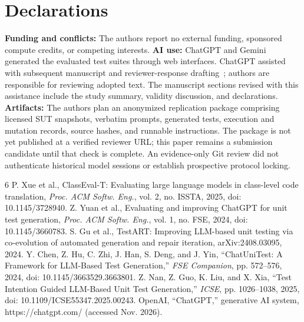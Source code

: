 \documentclass[conference]{IEEEtran}
\begin{document}
\section*{Declarations}
\textbf{Funding and conflicts:} The authors report no external funding, sponsored compute credits, or competing interests. \textbf{AI use:} ChatGPT and Gemini generated the evaluated test suites through web interfaces. ChatGPT assisted with subsequent manuscript and reviewer-response drafting~\cite{chatgpttool}; authors are responsible for reviewing adopted text. The manuscript sections revised with this assistance include the study summary, validity discussion, and declarations. \textbf{Artifacts:} The authors plan an anonymized replication package comprising licensed SUT snapshots, verbatim prompts, generated tests, execution and mutation records, source hashes, and runnable instructions. The package is not yet published at a verified reviewer URL; this paper remains a submission candidate until that check is complete. An evidence-only Git review did not authenticate historical model sessions or establish prospective protocol locking.

\begin{thebibliography}{6}
 P. Xue et al., ClassEval-T: Evaluating large language models in class-level code translation, \emph{Proc. ACM Softw. Eng.}, vol. 2, no. ISSTA, 2025, doi: 10.1145/3728940.
 Z. Yuan et al., Evaluating and improving ChatGPT for unit test generation, \emph{Proc. ACM Softw. Eng.}, vol. 1, no. FSE, 2024, doi: 10.1145/3660783.
 S. Gu et al., TestART: Improving LLM-based unit testing via co-evolution of automated generation and repair iteration, arXiv:2408.03095, 2024.
 Y. Chen, Z. Hu, C. Zhi, J. Han, S. Deng, and J. Yin, ``ChatUniTest: A Framework for LLM-Based Test Generation,'' \emph{FSE Companion}, pp. 572--576, 2024, doi: 10.1145/3663529.3663801.
 Z. Nan, Z. Guo, K. Liu, and X. Xia, ``Test Intention Guided LLM-Based Unit Test Generation,'' \emph{ICSE}, pp. 1026--1038, 2025, doi: 10.1109/ICSE55347.2025.00243.
 OpenAI, ``ChatGPT,'' generative AI system, https://chatgpt.com/ (accessed Nov. 2026).
\end{thebibliography}
\end{document}
